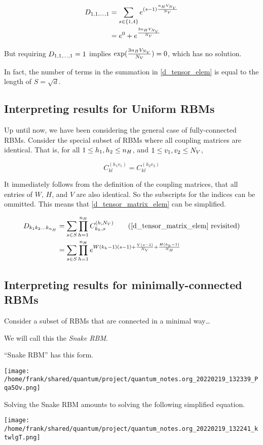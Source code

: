 \documentclass[11pt]{article}
\begin{document}
\begin{align}
D_{1, 1, \dots, 1} &= \sum_{s \in \{1, 4\}} e^{ (s -1) \frac{n_H V_{N_V}}{N_V} } \\
    &= e^{0} + e^{ \frac{3 n_H V_{N_V}}{N_V} }
\end{align}

But requiring \(D_{1, 1, \dots, 1} = 1\) implies \(\exp(\frac{3 n_H V_{N_V}}{N_V}) = 0\), which has no solution.

In fact, the number of terms in the summation in \eqref{d_tensor_elem} is equal to the length of \(S = \sqrt{d}\).

\subsection{Interpreting results for Uniform RBMs}
\label{sec:org8955aa1}
Up until now, we have been considering the general case of fully-connected RBMs.
Consider the special subset of RBMs where all coupling matrices are identical. That is, for all \( 1 \leq h_1, h_2 \leq n_H\), and \(1 \leq v_1, v_2 \leq N_V \),

\begin{equation}
C^{(h_1 v_1)}_{kl}  = C^{(h_2 v_2)}_{kl}
\end{equation}

It immediately follows from the definition of the coupling matrices, that all entries of \(W\), \(H\), and \(V\) are also identical.
So the subscripts for the indices can be ommitted. This means that \eqref{d_tensor_matrix_elem} can be simplified.

\begin{align}
D_{\ks} &= \sum_{s \in S} \prod_{h=1}^{\nH} C^{(h,\NV)}_{k_h, s} \tag{\ref{d_tensor_matrix_elem} revisited} \\
  &= \sum_{s \in S} \prod_{h=1}^{\nH} e^{{W} ({k}_{h} - 1 )(s - 1) + \frac{{V} (s - 1)}{N_{V}}  + \frac{{H} ({k}_{h} - 1)}{N_{H}}}
\end{align}


\subsection{Interpreting results for  minimally-connected RBMs}
\label{sec:orgedc0d18}
Consider a subset of RBMs that are connected in a minimal way\ldots{}

We will call this the \emph{Snake RBM}.

``Snake RBM'' has this form.

\begin{center}
\texttt{[image: /home/frank/shared/quantum/project/quantum\_notes.org\_20220219\_132339\_Pqa5Ov.png]}
\end{center}


Solving the Snake RBM amounts to solving the following simplified equation.

\begin{center}
\texttt{[image: /home/frank/shared/quantum/project/quantum\_notes.org\_20220219\_132241\_ktwlgT.png]}
\end{center}
\end{document}
